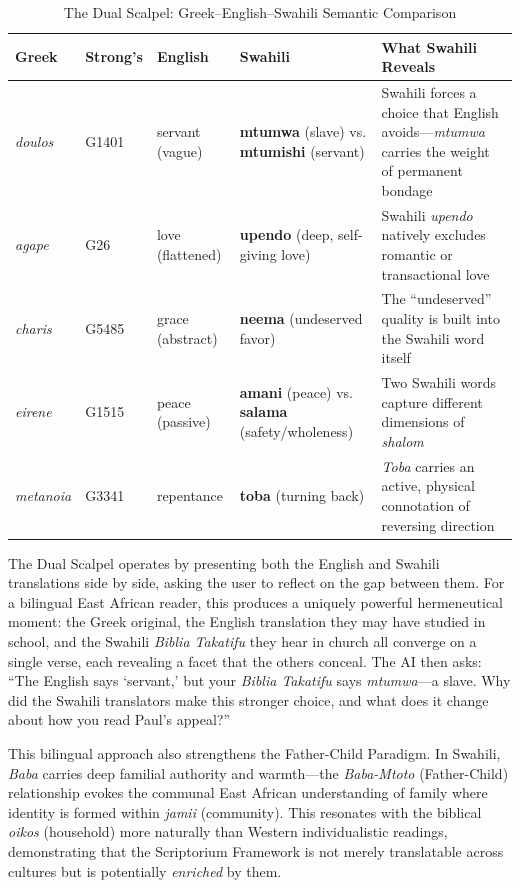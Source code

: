 \begin{table}[t]
\caption{The Dual Scalpel: Greek--English--Swahili Semantic Comparison}
\label{tab:dualscalpel}
\centering
\begin{tabular}{@{}llllp{}@{}}
\toprule
\textbf{Greek} & \textbf{Strong's} & \textbf{English} & \textbf{Swahili} & \textbf{What Swahili Reveals} \\ \midrule
\textit{doulos} & G1401 & servant (vague) & \textbf{mtumwa} (slave) vs. \textbf{mtumishi} (servant) & Swahili forces a choice that English avoids---\textit{mtumwa} carries the weight of permanent bondage \\ \midrule
\textit{agape} & G26 & love (flattened) & \textbf{upendo} (deep, self-giving love) & Swahili \textit{upendo} natively excludes romantic or transactional love \\ \midrule
\textit{charis} & G5485 & grace (abstract) & \textbf{neema} (undeserved favor) & The ``undeserved'' quality is built into the Swahili word itself \\ \midrule
\textit{eirene} & G1515 & peace (passive) & \textbf{amani} (peace) vs. \textbf{salama} (safety/wholeness) & Two Swahili words capture different dimensions of \textit{shalom} \\ \midrule
\textit{metanoia} & G3341 & repentance & \textbf{toba} (turning back) & \textit{Toba} carries an active, physical connotation of reversing direction \\ \bottomrule
\end{tabular}
\end{table}

The Dual Scalpel operates by presenting both the English and Swahili translations side by side, asking the user to reflect on the gap between them. For a bilingual East African reader, this produces a uniquely powerful hermeneutical moment: the Greek original, the English translation they may have studied in school, and the Swahili \textit{Biblia Takatifu} they hear in church all converge on a single verse, each revealing a facet that the others conceal. The AI then asks: ``The English says `servant,' but your \textit{Biblia Takatifu} says \textit{mtumwa}---a slave. Why did the Swahili translators make this stronger choice, and what does it change about how you read Paul's appeal?''

This bilingual approach also strengthens the Father-Child Paradigm. In Swahili, \textit{Baba} carries deep familial authority and warmth---the \textit{Baba-Mtoto} (Father-Child) relationship evokes the communal East African understanding of family where identity is formed within \textit{jamii} (community). This resonates with the biblical \textit{oikos} (household) more naturally than Western individualistic readings, demonstrating that the Scriptorium Framework is not merely translatable across cultures but is potentially \textit{enriched} by them.

